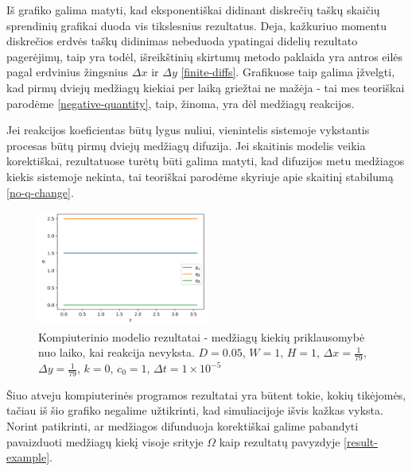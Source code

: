 Iš grafiko galima matyti, kad eksponentiškai didinant diskrečių taškų skaičių sprendinių grafikai duoda vis tikslesnius rezultatus. Deja, kažkuriuo momentu diskrečios erdvės taškų didinimas nebeduoda ypatingai didelių rezultato pagerėjimų, taip yra todėl, išreikštinių skirtumų metodo paklaida yra antros eilės pagal erdvinius žingsnius $\Delta x$ ir $\Delta y$ \eqref{finite-diffs}. Grafikuose taip galima įžvelgti, kad pirmų dviejų medžiagų kiekiai per laiką griežtai ne mažėja - tai mes teoriškai parodėme \eqref{negative-quantity}, taip, žinoma, yra dėl medžiagų reakcijos. 

\newpage
Jei reakcijos koeficientas būtų lygus nuliui, vienintelis sistemoje vykstantis procesas būtų pirmų dviejų medžiagų difuzija. Jei skaitinis modelis veikia korektiškai, rezultatuose turėtų būti galima matyti, kad difuzijos metu medžiagos kiekis sistemoje nekinta, tai teoriškai parodėme skyriuje apie skaitinį stabilumą \eqref{no-q-change}.

\begin{figure}[h!]
    \centering
    \includegraphics[width=0.5\textwidth]{../assets/no-reaction.png}
    \caption{Kompiuterinio modelio rezultatai - medžiagų kiekių priklausomybė nuo laiko, kai reakcija nevyksta. $D = 0.05$, $W = 1$, $H = 1$, $\Delta x = \frac{1}{79}$, $\Delta y = \frac{1}{79}$, $k = 0$, $c_0 = 1$, $\Delta t = 1\times 10^{-5}$ }
    \label{no-reaction}
\end{figure}



Šiuo atveju kompiuterinės programos rezultatai yra būtent tokie, kokių tikėjomės, tačiau iš šio grafiko negalime užtikrinti, kad simuliacijoje išvis kažkas vyksta. Norint patikrinti, ar medžiagos difunduoja korektiškai galime pabandyti pavaizduoti medžiagų kiekį visoje srityje $\Omega$ kaip rezultatų pavyzdyje \eqref{result-example}.

